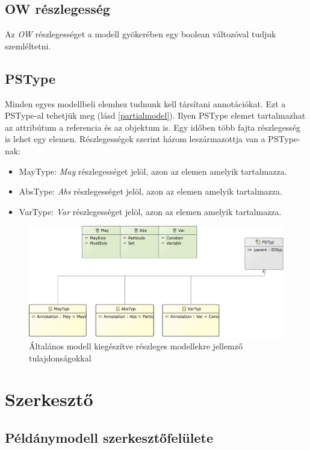 \subsection{OW részlegesség}
Az \textit{OW} részlegességet a modell gyökerében egy boolean változóval tudjuk szemléltetni.

\subsection{PSType}
Minden egyes modellbeli elemhez tudnunk kell társítani annotációkat. Ezt a PSType-al tehetjük meg (lásd \autoref{partialmodel}). Ilyen PSType elemet tartalmazhat az attribútum a referencia és az objektum is. Egy időben több fajta részlegesség is lehet egy elemen. Részlegességek szerint három leszármazottja van a PSType-nak:

\begin{itemize}  
	\item MayType: \textit{May} részlegességet jelöl, azon az elemen amelyik tartalmazza. 
	\item AbsType: \textit{Abs} részlegességet jelöl, azon az elemen amelyik tartalmazza.
	\item VarType: \textit{Var} részlegességet jelöl, azon az elemen amelyik tartalmazza.
\end{itemize}

\begin{figure}[!ht]
	\centering
	\includegraphics[width=150mm]{figures/partialmodel02.pdf}
	\caption{Általános modell kiegészítve részleges modellekre jellemző tulajdonságokkal}
	\label{partialmodel} 
\end{figure}

\section{Szerkesztő}
\subsection{Példánymodell szerkesztőfelülete}
